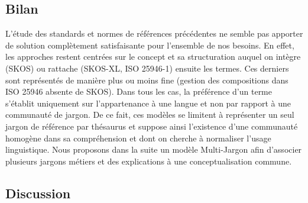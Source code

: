 \subsection*{Bilan}
L'étude des standards et normes de références précédentes ne semble pas apporter de solution complètement satisfaisante pour l'ensemble de nos besoins. 
En effet, les approches restent centrées sur le concept et sa structuration auquel on intègre (SKOS) ou rattache (SKOS-XL, ISO 25946-1) ensuite les termes. 
Ces derniers sont représentés de manière plus ou moins fine (gestion des compositions dans ISO 25946 absente de SKOS). 
Dans tous les cas, la préférence d'un terme s'établit uniquement sur l'appartenance à une langue et non par rapport à une communauté de jargon. %
De ce fait, ces modèles se limitent à représenter un seul jargon de référence par thésaurus et suppose ainsi l'existence d'une communauté homogène dans sa compréhension et dont on cherche à normaliser l'usage linguistique. %
Nous proposons dans la suite un modèle Multi-Jargon afin d'associer plusieurs jargons métiers et des explications à une conceptualisation commune. %


\subsection*{Discussion}

